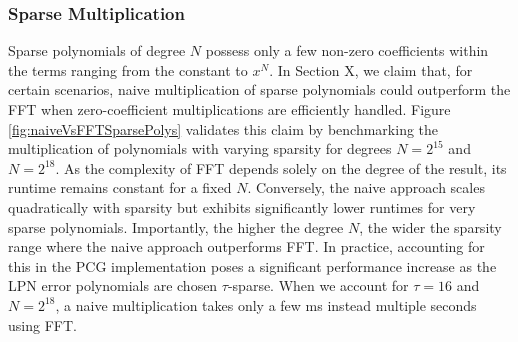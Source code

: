 \subsubsection{Sparse Multiplication}
Sparse polynomials of degree $N$ possess only a few non-zero coefficients within the terms ranging from the constant to $x^N$. In Section \todo X, we claim that, for certain scenarios, naive multiplication of sparse polynomials could outperform the FFT when zero-coefficient multiplications are efficiently handled. Figure \ref{fig:naiveVsFFTSparsePolys} validates this claim by benchmarking the multiplication of polynomials with varying sparsity for degrees $N=2^{15}$ and $N=2^{18}$. As the complexity of FFT depends solely on the degree of the result, its runtime remains constant for a fixed $N$.  Conversely, the naive approach scales quadratically with sparsity but exhibits significantly lower runtimes for very sparse polynomials. Importantly, the higher the degree $N$, the wider the sparsity range where the naive approach outperforms FFT. In practice, accounting for this in the PCG implementation poses a significant performance increase as the LPN error polynomials are chosen $\tau$-sparse. When we account for $\tau=16$ and $N=2^{18}$, a naive multiplication takes only a few ms instead multiple seconds using FFT.


